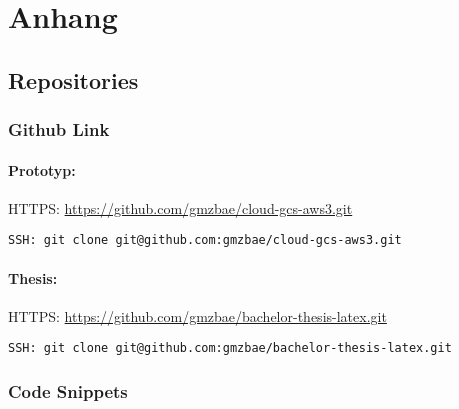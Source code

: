 
\chapter{Anhang}

\section{Repositories}
\subsection{Github Link}

\subsubsection*{Prototyp:}

HTTPS: \url{https://github.com/gmzbae/cloud-gcs-aws3.git}

\begin{verbatim}SSH: git clone git@github.com:gmzbae/cloud-gcs-aws3.git\end{verbatim}			

\subsubsection*{Thesis:}

HTTPS: \url{https://github.com/gmzbae/bachelor-thesis-latex.git}

\begin{verbatim}SSH: git clone git@github.com:gmzbae/bachelor-thesis-latex.git \end{verbatim}

\newpage

\subsection{Code Snippets}

